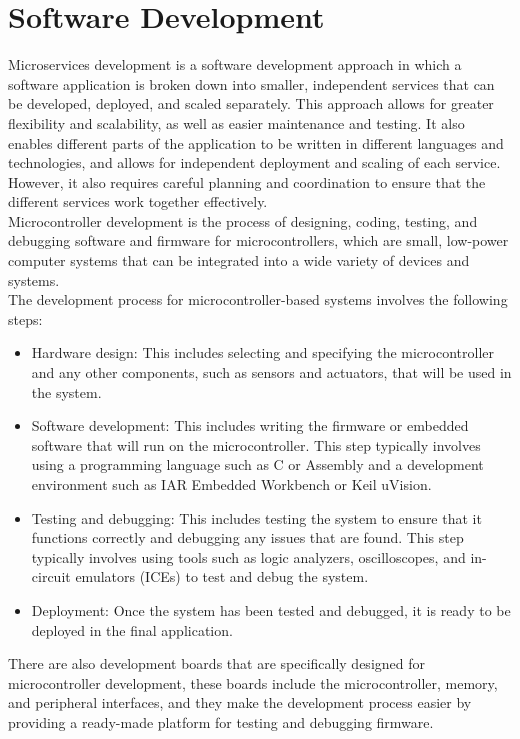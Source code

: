 \section{Software Development}
Microservices development is a software development approach in which a software application is broken down into smaller, independent services that can be developed, deployed, and scaled separately. This approach allows for greater flexibility and scalability, as well as easier maintenance and testing. It also enables different parts of the application to be written in different languages and technologies, and allows for independent deployment and scaling of each service. However, it also requires careful planning and coordination to ensure that the different services work together effectively.\vspace{5mm} \\
Microcontroller development is the process of designing, coding, testing, and debugging software and firmware for microcontrollers, which are small, low-power computer systems that can be integrated into a wide variety of devices and systems.\vspace{5mm} \\
The development process for microcontroller-based systems involves the following steps:
\begin{itemize}
\item Hardware design: This includes selecting and specifying the microcontroller and any other components, such as sensors and actuators, that will be used in the system.
\item Software development: This includes writing the firmware or embedded software that will run on the microcontroller. This step typically involves using a programming language such as C or Assembly and a development environment such as IAR Embedded Workbench or Keil uVision.
\item Testing and debugging: This includes testing the system to ensure that it functions correctly and debugging any issues that are found. This step typically involves using tools such as logic analyzers, oscilloscopes, and in-circuit emulators (ICEs) to test and debug the system.
\item Deployment: Once the system has been tested and debugged, it is ready to be deployed in the final application.
\end{itemize}
There are also development boards that are specifically designed for microcontroller development, these boards include the microcontroller, memory, and peripheral interfaces, and they make the development process easier by providing a ready-made platform for testing and debugging firmware.
